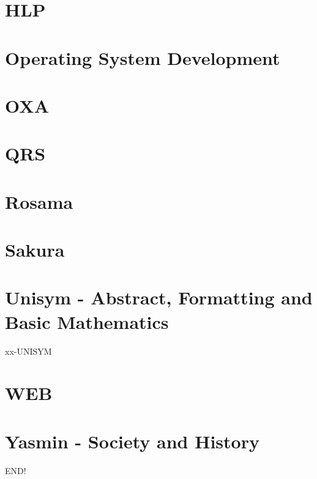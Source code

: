 \chapter{HLP}


\chapter{Operating System Development}


\chapter{OXA}


\chapter{QRS}


\chapter{Rosama}


\chapter{Sakura}


\chapter{Unisym \mbox{-} Abstract, Formatting and Basic Mathematics}
{xx-UNISYM}

\chapter{WEB}


\chapter{Yasmin \mbox{-} Society and History}


\newpage

\nocite{*}

END!
